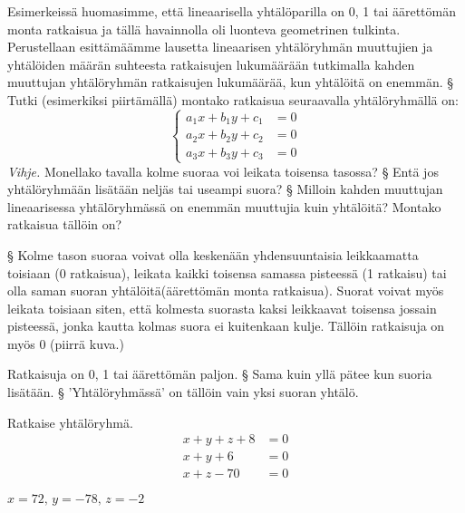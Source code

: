 \begin{tehtavasivu}
\begin{tehtava}
  Esimerkeissä huomasimme, että lineaarisella yhtälöparilla on 0, 1 tai äärettömän monta ratkaisua ja tällä havainnolla oli luonteva geometrinen tulkinta.
  Perustellaan esittämäämme lausetta lineaarisen yhtälöryhmän muuttujien ja yhtälöiden määrän suhteesta ratkaisujen lukumäärään tutkimalla kahden muuttujan yhtälöryhmän ratkaisujen lukumäärää, kun yhtälöitä on enemmän.
  \alakohdat
    § Tutki (esimerkiksi piirtämällä) montako ratkaisua seuraavalla yhtälöryhmällä on:
      \[
        \left\{
          \begin{aligned}
            a_1x+b_1y+c_1 &= 0 \\
            a_2x+b_2y+c_2 &= 0 \\
            a_3x+b_3y+c_3 &= 0
          \end{aligned}
        \right.
      \]
      \emph{Vihje.} Monellako tavalla kolme suoraa voi leikata toisensa tasossa?
    § Entä jos yhtälöryhmään lisätään neljäs tai useampi suora?
    § Milloin kahden muuttujan lineaarisessa yhtälöryhmässä on enemmän muuttujia kuin yhtälöitä? Montako ratkaisua tällöin on? 
  \loppu
  \begin{vastaus}
    \alakohdat
      § Kolme tason suoraa voivat olla keskenään yhdensuuntaisia leikkaamatta toisiaan (0 ratkaisua), leikata kaikki toisensa samassa pisteessä (1 ratkaisu) tai olla saman suoran yhtälöitä(äärettömän monta ratkaisua). Suorat voivat myös leikata toisiaan siten, että kolmesta suorasta kaksi leikkaavat toisensa jossain pisteessä, jonka kautta kolmas suora ei kuitenkaan kulje. Tällöin ratkaisuja on myös 0 (piirrä kuva.)

        Ratkaisuja on 0, 1 tai äärettömän paljon.
      § Sama kuin yllä pätee kun suoria lisätään.
      § 'Yhtälöryhmässä' on tällöin vain yksi suoran yhtälö.
    \loppu
  \end{vastaus}
\end{tehtava}

\begin{tehtava}
    Ratkaise yhtälöryhmä.
    \begin{align*}
        x+y+z+8 &= 0 \\
        x+y+6 &=0 \\
        x+z-70 &=0
    \end{align*}
    \begin{vastaus}
        $x = 72, \, y = -78, \, z = -2$
    \end{vastaus}
\end{tehtava}


\end{tehtavasivu}
